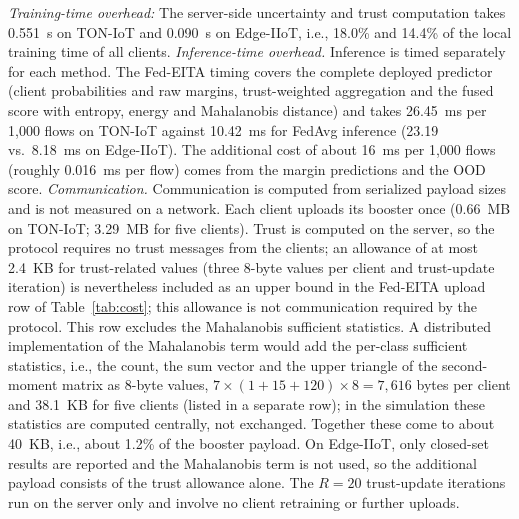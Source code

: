 \documentclass[pdflatex,sn-mathphys-num]{sn-jnl}
\begin{document}
{{{\emph{Training-time overhead:} The server-side uncertainty and trust computation takes 0.551~s on TON-IoT and 0.090~s on Edge-IIoT, i.e., 18.0\% and 14.4\% of the local training time of all clients. \emph{Inference-time overhead.} Inference is timed separately for each method. The Fed-EITA timing covers the complete deployed predictor (client probabilities and raw margins, trust-weighted aggregation and the fused score with entropy, energy and Mahalanobis distance) and takes 26.45~ms per 1{,}000 flows on TON-IoT against 10.42~ms for FedAvg inference (23.19 vs.\ 8.18~ms on Edge-IIoT). The additional cost of about 16~ms per 1{,}000 flows (roughly 0.016~ms per flow) comes from the margin predictions and the OOD score. \emph{Communication.} Communication is computed from serialized payload sizes and is not measured on a network. Each client uploads its booster once (0.66~MB on TON-IoT; 3.29~MB for five clients). Trust is computed on the server, so the protocol requires no trust messages from the clients; an allowance of at most 2.4~KB for trust-related values (three 8-byte values per client and trust-update iteration) is nevertheless included as an upper bound in the Fed-EITA upload row of Table~\ref{tab:cost}; this allowance is not communication required by the protocol. This row excludes the Mahalanobis sufficient statistics. A distributed implementation of the Mahalanobis term would add the per-class sufficient statistics, i.e., the count, the sum vector and the upper triangle of the second-moment matrix as 8-byte values, $7\times(1+15+120)\times8=7{,}616$ bytes per client and 38.1~KB for five clients (listed in a separate row); in the simulation these statistics are computed centrally, not exchanged. Together these come to about 40~KB, i.e., about 1.2\% of the booster payload. On Edge-IIoT, only closed-set results are reported and the Mahalanobis term is not used, so the additional payload consists of the trust allowance alone. The $R=20$ trust-update iterations run on the server only and involve no client retraining or further uploads.}




}}
\end{document}
